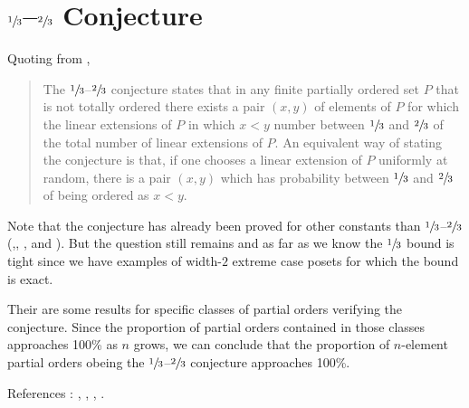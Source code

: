 \section{$\sfrac{1}{3}$--$\sfrac{2}{3}$ Conjecture}

Quoting from \cite{wiki:linext},

\begin{quotation}
The $\sfrac{1}{3}$--$\sfrac{2}{3}$ conjecture states that in any finite partially ordered set $P$ that is not totally ordered there exists a pair $(x,y)$ of elements of $P$ for which the linear extensions of $P$ in which $x < y$ number between $\sfrac{1}{3}$ and $\sfrac{2}{3}$ of the total number of linear extensions of $P$. An equivalent way of stating the conjecture is that, if one chooses a linear extension of $P$ uniformly at random, there is a pair $(x,y)$ which has probability between $\sfrac{1}{3}$ and $\sfrac{2}{3}$ of being ordered as $x < y$.
\end{quotation}

Note that the conjecture has already been proved for other constants than $\sfrac{1}{3}$--$\sfrac{2}{3}$ (\cite{kahn1984balancing},\cite{linial1984information}, \cite{kahn1991balancing}, \cite{brightwell1995balancing} and \cite{brightwell1999balanced}). But the question still remains and as far as we know the $\sfrac{1}{3}$ bound is tight since we have examples of width-$2$ extreme case posets for which the bound is exact. 


Their are some results for specific classes of partial orders verifying the conjecture. Since the proportion of partial orders contained in those classes approaches 100\% as $n$ grows, we can conclude that the proportion of $n$-element partial orders obeing the $\sfrac{1}{3}$--$\sfrac{2}{3}$ conjecture approaches 100\%.


References : \cite{kral2013new}, \cite{zaguia20111}, \cite{peczarski2006gold}, \cite{peczarski2008gold}.